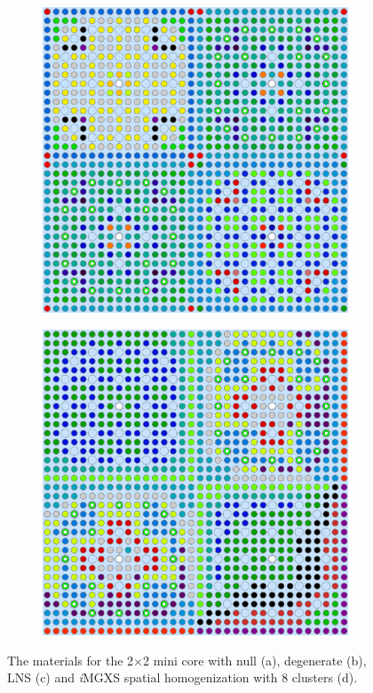 \documentclass[12pt,twoside]{mitthesis-exec}
\begin{document}
\begin{figure}[h!]
\begin{subfigure}{0.47\textwidth}
  \centering
  \includegraphics[width=0.8\linewidth]{figures/patterns/lns/reflector/materials}
  \caption{}
  \label{fig:reflector-lns}
\end{subfigure}%
\begin{subfigure}{0.47\textwidth}
  \centering
  \includegraphics[width=0.8\linewidth]{figures/unsupervised/geometries/with-features/8-clusters/combined/reflector}
  \caption{}
  \label{fig:reflector-8-clusters}
\end{subfigure}
\caption[Materials for the 2$\times$2 mini core]{The materials for the 2$\times$2 mini core with null (a), degenerate (b), LNS (c) and \textit{i}MGXS spatial homogenization with 8 clusters (d).}
\label{fig:colorset-geometries}
\end{figure}
\end{document}

